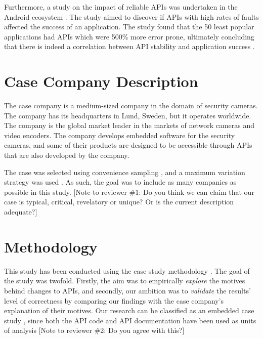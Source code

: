 \documentclass[10pt,twocolumn]{article}
\begin{document}
Furthermore, a study on the impact of reliable APIs was undertaken in the Android ecosystem \cite{mcdonnell2013empirical}. The study aimed to discover if APIs with high rates of faults affected the success of an application. The study found that the 50 least popular applications had APIs which were 500\% more error prone, ultimately concluding that there is indeed a correlation between API stability and application success \cite{mcdonnell2013empirical}. 

\section{Case Company Description}
The case company is a medium-sized company in the domain of security cameras. The company has its headquarters in Lund, Sweden, but it operates worldwide. The company is the global market leader in the markets of network cameras and video encoders. The company develops embedded software for the security cameras, and some of their products are designed to be accessible through APIs that are also developed by the company. 


The case was selected using convenience sampling \cite{flyvbjerg2006five}, and a maximum variation strategy was used \cite{benbasat1987case}. As such, the goal was to include as many companies as possible in this study. [Note to reviewer \#1: Do you think we can claim that our case is typical, critical, revelatory or unique? Or is the current description adequate?]



\section{Methodology}
This study has been conducted using the case study methodology \cite{runeson2009guidelines}. The goal of the study was twofold. Firstly, the aim was to empirically \textit{explore} the motives behind changes to APIs, and secondly, our ambition was to \textit{validate} the results' level of correctness by comparing our findings with the case company's explanation of their motives. Our research can be classified as an embedded case study \cite{yin2013case}, since both the API code and API documentation have been used as units of analysis [Note to reviewer \#2: Do you agree with this?] 
\end{document}
